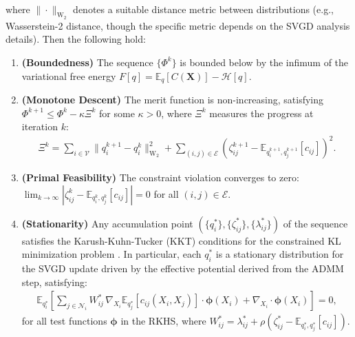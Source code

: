 \begin{theorem}
\begin{equation}
\begin{aligned}
\label{eq:merit_function}
\end{aligned}
\end{equation}
where $\| \cdot \|_{\text{W}_2}$ denotes a suitable distance metric between distributions (e.g., Wasserstein-2 distance, though the specific metric depends on the SVGD analysis details). Then the following hold:
\begin{enumerate}
    \item \textbf{(Boundedness)} The sequence $\{\Phi^k\}$ is bounded below by the infimum of the variational free energy $F[q] = \mathbb{E}_q[C({\mathbf{X}})] - {\mathcal{H}}[q]$.
    \item \textbf{(Monotone Descent)} The merit function is non-increasing, satisfying $\Phi^{k+1} \le \Phi^k - \kappa \Xi^k$ for some $\kappa > 0$, where $\Xi^k$ measures the progress at iteration $k$:
    \begin{equation}
    \begin{aligned}
    \Xi^k = \sum_{i \in {\mathcal{V}}} \|q_i^{k+1} - q_i^k\|^2_{\text{W}_2} + \sum_{(i,j) \in {\mathcal{E}}} (\zeta_{ij}^{k+1} - \mathbb{E}_{q_i^{k+1}, q_j^{k+1}}[c_{ij}])^2.
    \label{eq:progress_measure}
    \end{aligned}
    \end{equation}
    \item \textbf{(Primal Feasibility)} The constraint violation converges to zero: $\lim_{k \to \infty} |\zeta_{ij}^k - \mathbb{E}_{q_i^k, q_j^k}[c_{ij}]| = 0$ for all $(i,j) \in {\mathcal{E}}$.
    \item \textbf{(Stationarity)} Any accumulation point $(\{q_i^*\}, \{\zeta_{ij}^*\}, \{\lambda_{ij}^*\})$ of the sequence satisfies the Karush-Kuhn-Tucker (KKT) conditions for the constrained KL minimization problem . In particular, each $q_i^*$ is a stationary distribution for the SVGD update driven by the effective potential derived from the ADMM step, satisfying:
    \begin{equation}
    \begin{aligned}
    \mathbb{E}_{q_i^*} \left[ \sum_{j \in {\mathcal{N}}_i} W_{ij}^* \, \nabla_{X_i} \mathbb{E}_{q_j^*}[c_{ij}(X_i, X_j)] \cdot \boldsymbol{\phi}(X_i) + \nabla_{X_i} \cdot \boldsymbol{\phi}(X_i) \right] = 0,
    \label{eq:kkt_stationarity}
    \end{aligned}
    \end{equation}
    for all test functions $\boldsymbol{\phi}$ in the RKHS, where $W_{ij}^* = \lambda_{ij}^* + \rho(\zeta_{ij}^* - \mathbb{E}_{q_i^*, q_j^*}[c_{ij}])$.

\end{enumerate}
\end{theorem}
